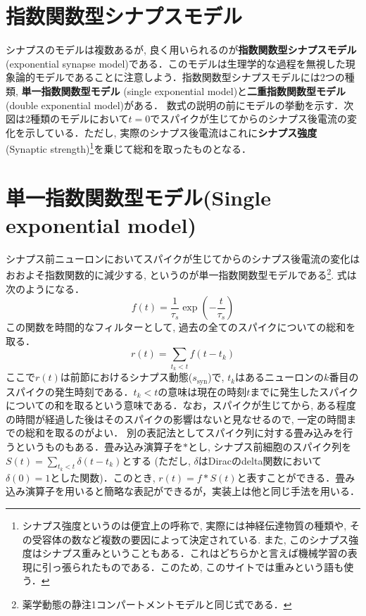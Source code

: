 \section{指数関数型シナプスモデル}
シナプスのモデルは複数あるが, 良く用いられるのが\textbf{指数関数型シナプスモデル}(exponential synapse model)である．このモデルは生理学的な過程を無視した現象論的モデルであることに注意しよう．指数関数型シナプスモデルには2つの種類, \textbf{単一指数関数型モデル} (single exponential model)と\textbf{二重指数関数型モデル} (double exponential model)がある．
数式の説明の前にモデルの挙動を示す．次図は2種類のモデルにおいて$t=0$でスパイクが生じてからのシナプス後電流の変化を示している．ただし, 実際のシナプス後電流はこれに\textbf{シナプス強度} (Synaptic strength)\footnote{シナプス強度というのは便宜上の呼称で, 実際には神経伝達物質の種類や, その受容体の数など複数の要因によって決定されている. また, このシナプス強度はシナプス重みということもある．これはどちらかと言えば機械学習の表現に引っ張られたものである．このため, このサイトでは重みという語も使う．}を乗じて総和を取ったものとなる．
\section{単一指数関数型モデル(Single exponential model)}
シナプス前ニューロンにおいてスパイクが生じてからのシナプス後電流の変化はおおよそ指数関数的に減少する, というのが単一指数関数型モデルである\footnote{薬学動態の静注1コンパートメントモデルと同じ式である．}. 式は次のようになる．
\begin{equation}
f(t)=\frac{1}{\tau_{s}}\exp\left(-\frac{t}{\tau_s}\right)    
\end{equation}
この関数を時間的なフィルターとして, 過去の全てのスパイクについての総和を取る．
\begin{equation}
r(t)=\sum_{t_{k}< t} f\left(t-t_{k}\right)
\end{equation}
ここで${r(t)}$は前節におけるシナプス動態($s_{\text{syn}}$)で, $t_{k}$はあるニューロンの$k$番目のスパイクの発生時刻である．${t_{k}<t}$の意味は現在の時刻$t$までに発生したスパイクについての和を取るという意味である．なお，スパイクが生じてから, ある程度の時間が経過した後はそのスパイクの影響はないと見なせるので, 一定の時間までの総和を取るのがよい．
別の表記法としてスパイク列に対する畳み込みを行うというものもある．畳み込み演算子を$*$とし, シナプス前細胞のスパイク列を$S(t)=\sum_{t_{k}< t} \delta\left(t-t_{k}\right)$とする (ただし, $\delta$はDiracのdelta関数において$\delta(0)=1$とした関数)．このとき, $r(t)=f*S(t)$と表すことができる．畳み込み演算子を用いると簡略な表記ができるが，実装上は他と同じ手法を用いる．

